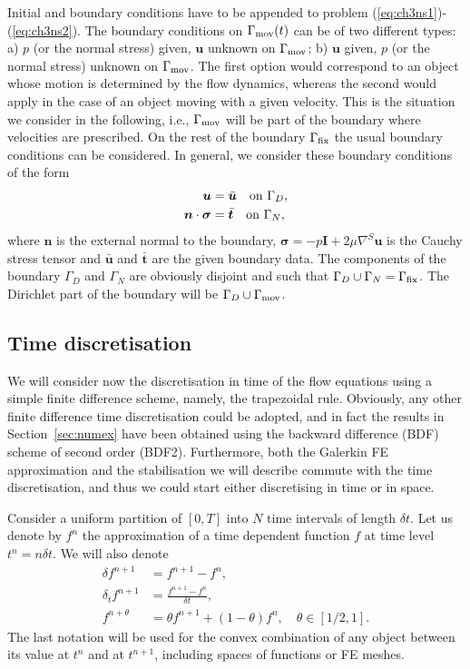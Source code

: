 \documentclass[11pt,a4paper,oneside,reqno]{amsart}
\newcommand{\Eq}[1]{(\ref{eq:#1})}
\def\u{{\bm u}}
\def\cl{\nonumber\\}
\def\el{{\nonumber}}
\def\nor{{\bm n}}
\def\dt{{\delta t}}
\begin{document}
Initial and boundary conditions have to be appended to problem \Eq{ch3ns1}-\Eq{ch3ns2}. 
The boundary conditions on $\Gamma_{\rm mov}(t)$ can be of two different types:
a) $p$ (or the normal stress) given, $\u$ unknown on $\Gamma_{\rm mov}$;
b) $\u$ given, $p$ (or the normal stress) unknown on $\Gamma_{\rm mov}$. The first option would correspond to an object whose motion is determined by the flow dynamics, whereas the second would apply in the case of an object moving with a given velocity. This is the situation we consider in the following, i.e., $\Gamma_{\rm mov}$ will be part of the boundary where velocities are prescribed. On the rest of the boundary $\Gamma_{\rm fix}$ the usual boundary conditions can be considered. In general, we consider these boundary conditions of the form
\begin{align}
\u & = \bar{\u} \quad \hbox{on}~\Gamma_D,\cl
\nor\cdot{\bm\sigma} & = \bar{\bm t}\quad \hbox{on}~\Gamma_N,\el
\end{align}
where $\nor$ is the external normal to the boundary, ${\bm\sigma} = -p {\bm I} + 2\mu\nabla^S \u$ is the 
Cauchy stress tensor and $\bar{\u}$  and $\bar{\bm t}$ are the given boundary data. The components of the
boundary $\Gamma_D$ and $\Gamma_N$ are obviously disjoint and such that $\Gamma_D\cup\Gamma_N = \Gamma_{\rm fix}$. The Dirichlet part of the boundary will be $\Gamma_D\cup \Gamma_{\rm mov}$.

\subsection{Time discretisation}\label{ch3semid}

We will consider now the discretisation in time of the flow equations using a simple finite difference scheme, namely, the trapezoidal rule. Obviously, any other finite difference time discretisation could be adopted, and in fact the results in Section~\ref{sec:numex} have been obtained using the backward difference (BDF) scheme of second order (BDF2). Furthermore, both the Galerkin FE approximation and the stabilisation we will describe commute with the time discretisation, and thus we could start either discretising in time or in space. 

Consider a uniform partition of $[0,T]$ into $N$ time intervals of length $\dt$. Let us denote by $f^n$ the approximation of a time dependent function $f$ at time level $t^n = n\dt$. We will also denote
\begin{align}
\delta f^{n+1} & = f^{n+1} - f^{n}, \nonumber\\
\delta_t f^{n+1} & = \frac{f^{n+1} - f^{n}}{\dt}, \nonumber\\
f^{n+\theta} & = \theta f^{n+1} + (1-\theta) f^n, \quad \theta\in [1/2,1].\nonumber
\end{align}
The last notation will be used for the convex combination of any object between its value at $t^n$ and at $t^{n+1}$, including spaces of functions or FE meshes.
\end{document}

